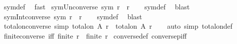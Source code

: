 \begin{isabellebody}
\ sym{\isacharunderscore}{\kern0pt}def\ \isamarkupfalse%
\ fast%
\endisatagproof
{\isafoldproof}%
%
\isadelimproof
\isanewline
%
\endisadelimproof
\isanewline
{}\isamarkupfalse%
\ sym{\isacharunderscore}{\kern0pt}Un{\isacharunderscore}{\kern0pt}converse{\isacharcolon}{\kern0pt}\ {\isachardoublequoteopen}sym\ {\isacharparenleft}{\kern0pt}r\ {\isasymunion}\ r{\isasyminverse}{\isacharparenright}{\kern0pt}{\isachardoublequoteclose}\isanewline
%
\isadelimproof
\ \ %
\endisadelimproof
%
\isatagproof
{}\isamarkupfalse%
\ sym{\isacharunderscore}{\kern0pt}def\ \isamarkupfalse%
\ blast%
\endisatagproof
{\isafoldproof}%
%
\isadelimproof
\isanewline
%
\endisadelimproof
\isanewline
{}\isamarkupfalse%
\ sym{\isacharunderscore}{\kern0pt}Int{\isacharunderscore}{\kern0pt}converse{\isacharcolon}{\kern0pt}\ {\isachardoublequoteopen}sym\ {\isacharparenleft}{\kern0pt}r\ {\isasyminter}\ r{\isasyminverse}{\isacharparenright}{\kern0pt}{\isachardoublequoteclose}\isanewline
%
\isadelimproof
\ \ %
\endisadelimproof
%
\isatagproof
{}\isamarkupfalse%
\ sym{\isacharunderscore}{\kern0pt}def\ \isamarkupfalse%
\ blast%
\endisatagproof
{\isafoldproof}%
%
\isadelimproof
\isanewline
%
\endisadelimproof
\isanewline
{}\isamarkupfalse%
\ total{\isacharunderscore}{\kern0pt}on{\isacharunderscore}{\kern0pt}converse\ {\isacharbrackleft}{\kern0pt}simp{\isacharbrackright}{\kern0pt}{\isacharcolon}{\kern0pt}\ {\isachardoublequoteopen}total{\isacharunderscore}{\kern0pt}on\ A\ {\isacharparenleft}{\kern0pt}r{\isasyminverse}{\isacharparenright}{\kern0pt}\ {\isacharequal}{\kern0pt}\ total{\isacharunderscore}{\kern0pt}on\ A\ r{\isachardoublequoteclose}\isanewline
%
\isadelimproof
\ \ %
\endisadelimproof
%
\isatagproof
{}\isamarkupfalse%
\ {\isacharparenleft}{\kern0pt}auto\ simp{\isacharcolon}{\kern0pt}\ total{\isacharunderscore}{\kern0pt}on{\isacharunderscore}{\kern0pt}def{\isacharparenright}{\kern0pt}%
\endisatagproof
{\isafoldproof}%
%
\isadelimproof
\isanewline
%
\endisadelimproof
\isanewline
{}\isamarkupfalse%
\ finite{\isacharunderscore}{\kern0pt}converse\ {\isacharbrackleft}{\kern0pt}iff{\isacharbrackright}{\kern0pt}{\isacharcolon}{\kern0pt}\ {\isachardoublequoteopen}finite\ {\isacharparenleft}{\kern0pt}r{\isasyminverse}{\isacharparenright}{\kern0pt}\ {\isacharequal}{\kern0pt}\ finite\ r{\isachardoublequoteclose}\isanewline
%
\isadelimproof
%
\endisadelimproof
%
\isatagproof
{}\isamarkupfalse%
\ converse{\isacharunderscore}{\kern0pt}def\ conversep{\isacharunderscore}{\kern0pt}iff\ \isamarkupfalse%

\end{isabellebody}

